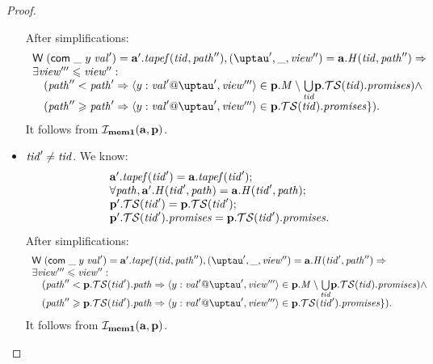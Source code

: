\begin{proof}
\begin{itemize}
        After simplifications:
    \[\begin{array}{l}
    \tapeWrite{(\tapeWriteCommitted{\_}{y}{\stval'})} = \aT'.\tapef(\tId, \cpath''),
       (\tau', \_, \R'') = \aT.\hmap(\tId, \cpath'') => \\
    \exists \R''' \le \R'': \\
    \quad (\cpath'' <   \cpath' => \writeEvt{y}{\stval'}{\tau'}{\R'''}
               \in \p.\Mprom \setminus \underset{\tId}{\bigcup} \p.\TSfprom(\tId).\PromSet) \land \\
    \quad (\cpath'' \ge \cpath' => \writeEvt{y}{\stval'}{\tau'}{\R'''}
               \in \p.\TSfprom(\tId).\PromSet \}).\\
    \end{array}\]
      It follows from $\mathcal{I}_{\rm \bf mem1}(\mathbf{a}, \mathbf{p})$.
    \item $\mathit{tid}' \not = \mathit{tid}$.
    We know:
    \[\begin{array}{l}
      \mathbf{a}'.\mathit{tapef}(\mathit{tid}') = \mathbf{a}.\mathit{tapef}(\mathit{tid}'); \\
      \forall \mathit{path}, \mathbf{a}'.\mathit{H}(\mathit{tid}', \mathit{path}) = \mathbf{a}.\mathit{H}(\mathit{tid}', \mathit{path}); \\
      \mathbf{p}'.\mathcal{TS}(\mathit{tid}') = \mathbf{p}.\mathcal{TS}(\mathit{tid}');\\
      \mathbf{p}'.\mathcal{TS}(\mathit{tid}').\mathit{promises} = \mathbf{p}.\mathcal{TS}(\mathit{tid}').\mathit{promises}.
    \end{array}\]
        After simplifications:
    \[\begin{array}{l}
    \tapeWrite{(\tapeWriteCommitted{\_}{y}{\stval'})} = \aT'.\tapef(\tId, \cpath''),
       (\tau', \_, \R'') = \aT.\hmap(\tId', \cpath'') => \\
    \exists \R''' \le \R'': \\
    \quad (\cpath'' <   \p.\TSfprom(\tId').\cpath => \writeEvt{y}{\stval'}{\tau'}{\R'''}
               \in \p.\Mprom \setminus \underset{\tId}{\bigcup} \p.\TSfprom(\tId).\PromSet) \land \\
    \quad (\cpath'' \ge \p.\TSfprom(\tId').\cpath => \writeEvt{y}{\stval'}{\tau'}{\R'''}
               \in \p.\TSfprom(\tId').\PromSet \}).\\
    \end{array}\]
    It follows from $\mathcal{I}_{\rm \bf mem1}(\mathbf{a}, \mathbf{p})$.
  \end{itemize}


\end{proof}
